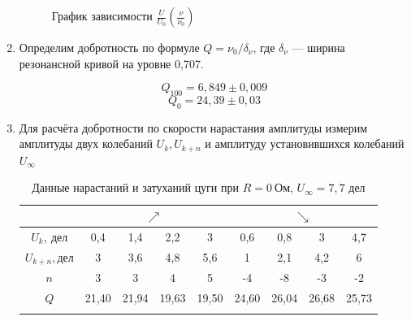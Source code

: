 \documentclass[a4paper, 12pt]{article}%
\begin{document}
\begin{enumerate}
\begin{longtable} {|c|c|c|c|c|c|c|c|c|c|c|c|}
		\end{longtable}
		\begin{figure}[H]
			\caption{График зависимости $\frac{U}{U_0}(\frac{\nu}{\nu_0})$}
		\end{figure}
		
		
		\item Определим добротность по формуле $Q = \nu_0/\delta_{\nu}$, где $\delta_{\nu}$ — ширина резонансной кривой на уровне 0,707.
		
		
		$$ Q_{100} = 6,849 \pm 0,009$$
		$$ Q_0 = 24,39\pm 0,03 $$
		
		\item Для расчёта добротности по скорости нарастания амплитуды измерим амплитуды двух колебаний $U_k, U_{k+n}$ и амплитуду установившихся колебаний $U_{\infty}$
		
		
		\begin{longtable}{|c|c|c|c|c|c|c|c|c|}  \hline
			{} & \multicolumn{4}{|c|}{$\nearrow$} & \multicolumn{4}{|c|}{$\searrow$} \\\hline
			$U_k,\ \text{дел}$ & 0,4 & 1,4 & 2,2 & 3 & 0,6 & 0,8 & 3 & 4,7 \\\hline
			$U_{k+n}, \text{дел}$ & 3 & 3,6 & 4,8 & 5,6 & 1 & 2,1 & 4,2 & 6 \\\hline
			$n$ & 3 & 3 & 4 & 5 & -4 & -8 & -3 & -2 \\\hline
			$Q$ & 21,40 & 21,94 & 19,63 & 19,50 & 24,60 & 26,04 & 26,68 & 25,73 \\\hline
			\caption{Данные нарастаний и затуханий цуги при $R = 0\ \text{Ом, } U_{\infty} = 7,7$ дел}
		\end{longtable}
		

\end{enumerate}
\end{document}
